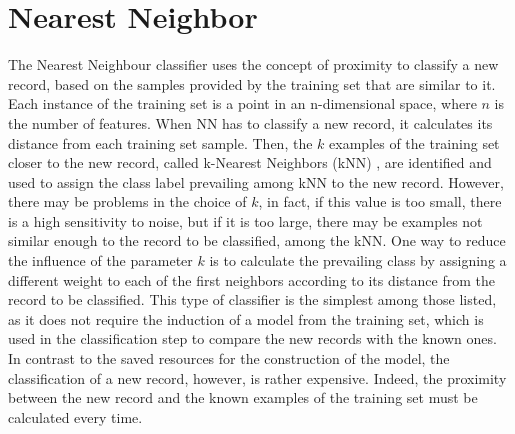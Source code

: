 \documentclass[final,a4paper,12pt,english]{UnicaPhdThesis3}
\begin{document}
\section{Nearest Neighbor} \label{kNN}
The Nearest Neighbour classifier uses the concept of proximity to classify a new record, based on the samples provided by the training set that are similar to it. Each instance of the training set is a point in an n-dimensional space, where $n$ is the number of features. When NN has to classify a new record, it calculates its distance from each training set sample. Then, the $k$ examples of the training set closer to the new record, called k-Nearest Neighbors (k\acs{NN})  \cite{Cover}, are identified and used to assign the class label prevailing among kNN to the new record. However, there may be problems in the choice of $k$, in fact, if this value is too small, there is a high sensitivity to noise, but if it is too large, there may be examples not similar enough to the record to be classified, among the kNN. One way to reduce the influence of the parameter $k$ is to calculate the prevailing class by assigning a different weight to each of the first neighbors according to its distance from the record to be classified. This type of classifier is the simplest among those listed, as it does not require the induction of a model from the training set, which is used in the classification step to compare the new records with the known ones. In contrast to the saved resources for the construction of the model, the classification of a new record, however, is rather expensive. Indeed, the proximity between the new record and the known examples of the training set must be calculated every time.
\end{document}
